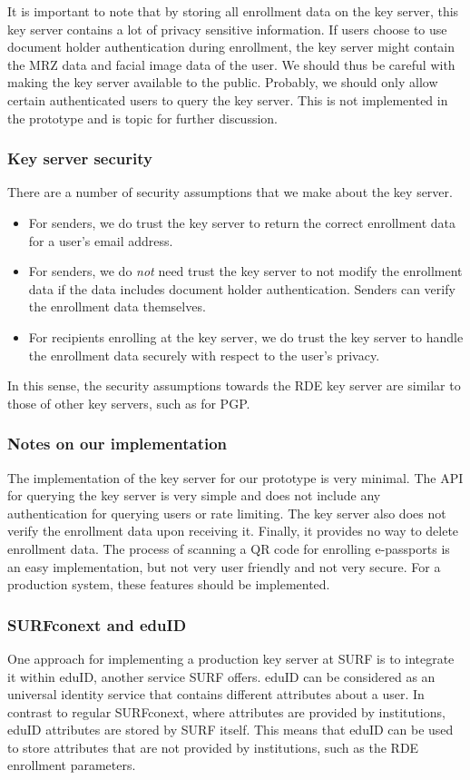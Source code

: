 It is important to note that by storing all enrollment data on the key server, this key server contains a lot of privacy sensitive information.
If users choose to use document holder authentication during enrollment, the key server might contain the MRZ data and facial image data of the user.
We should thus be careful with making the key server available to the public.
Probably, we should only allow certain authenticated users to query the key server.
This is not implemented in the prototype and is topic for further discussion.

\subsubsection{Key server security}\label{subsubsec:key-server-security}
There are a number of security assumptions that we make about the key server.
\begin{itemize}
    \item For senders, we do trust the key server to return the correct enrollment data for a user's email address.
    \item For senders, we do \emph{not} need trust the key server to not modify the enrollment data if the data includes document holder authentication.
    Senders can verify the enrollment data themselves.
    \item For recipients enrolling at the key server, we do trust the key server to handle the enrollment data securely with respect to the user's privacy.
\end{itemize}
In this sense, the security assumptions towards the RDE key server are similar to those of other key servers, such as for PGP.

\subsubsection{Notes on our implementation}\label{subsubsec:keyserver-notes-on-our-implementation}
The implementation of the key server for our prototype is very minimal.
The API for querying the key server is very simple and does not include any authentication for querying users or rate limiting.
The key server also does not verify the enrollment data upon receiving it.
Finally, it provides no way to delete enrollment data.
The process of scanning a QR code for enrolling e-passports is an easy implementation, but not very user friendly and not very secure.
For a production system, these features should be implemented.

\subsubsection{SURFconext and eduID}\label{subsubsec:surfconext-and-eduid}
One approach for implementing a production key server at SURF is to integrate it within eduID, another service SURF offers.
eduID can be considered as an universal identity service that contains different attributes about a user.
In contrast to regular SURFconext, where attributes are provided by institutions, eduID attributes are stored by SURF itself.
This means that eduID can be used to store attributes that are not provided by institutions, such as the RDE enrollment parameters.

